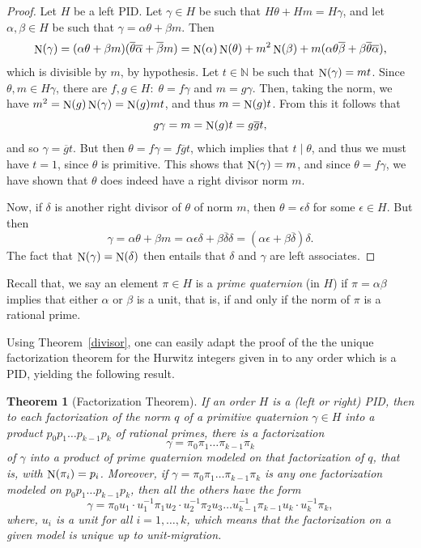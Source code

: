 \documentclass[10pt]{article}
\newtheorem{theorem}{Theorem}
\theoremstyle{definition}
\newcommand\NN{\mathbb{N}}
\newcommand\N{\mathop{\rm N}\nolimits}
\begin{document}
\begin{proof}
  Let $H$ be a left PID.  Let $\gamma \in H$ be such that
  $H \theta + H m = H \gamma$, and let $\alpha, \beta \in H$ be such
  that $\gamma = \alpha \theta + \beta m$. Then
  \[\N(\gamma) = (\alpha \theta + \beta m ) (\overline{\theta}
    \overline{\alpha} + \overline{\beta}m) = \N(\alpha) \N(\theta) +
    m^2 \N(\beta) + m (\alpha \theta \overline{\beta} + \beta
    \overline{\theta} \overline{\alpha}),\] which is divisible by $m$,
  by hypothesis. Let $t \in \NN$ be such that $\N(\gamma)=mt$. Since
  $\theta, m \in H\gamma$, there are
  $f,g \in H \colon \; \theta = f \gamma$ and $m = g \gamma$. Then,
  taking the norm, we have $m^2 = \N(g) \N(\gamma) = \N(g) mt$, and
  thus $m = \N(g)t$. From this it follows that
  \[g \gamma = m = \N(g) t = g\overline{g}t,\] and so
  $\gamma = \overline{g}t$. But then
  $\theta = f \gamma = f \overline{g}t$, which implies that
  $t \mid \theta$, and thus we must have $t = 1$, since $\theta$ is
  primitive. This shows that $\N(\gamma) = m$, and since
  $\theta = f \gamma$, we have shown that $\theta$ does indeed have a
  right divisor norm $m$.
	
  Now, if $\delta$ is another right divisor of $\theta$ of norm $m$,
  then $\theta = \epsilon \delta$ for some $\epsilon \in H$.  But then
  \[\gamma = \alpha \theta + \beta m = \alpha \epsilon \delta + \beta
    \overline{\delta} \delta = (\alpha \epsilon + \beta
    \overline{\delta}) \delta.\] The fact that
  $\N(\gamma) = \N(\delta)$ then entails that $\delta$ and $\gamma$
  are left associates.
\end{proof}

Recall that, we say an element $\pi \in H$ is a \textit{prime
  quaternion} (in $H$) if $\pi = \alpha \beta $ implies that either
$\alpha$ or $\beta$ is a unit, that is, if and only if the norm of
$\pi$ is a rational prime.

Using Theorem~\ref{divisor}, one can easily adapt the proof of the the
unique factorization theorem for the Hurwitz integers given in
\cite{Conway_Smith} to any order which is a PID, yielding the
following result.

\begin{theorem}[Factorization Theorem] \label{Fact_thm} If an order
  $H$ is a (left or right) PID, then to each factorization of the norm
  $q$ of a primitive quaternion $\gamma \in H$ into a product
  $p_0p_1 \dots p_{k-1}p_k$ of rational primes, there is a
  factorization
  \[ \gamma = \pi_0 \pi_1 \dots \pi_{k-1} \pi_k \] of $\gamma$ into a
  product of prime quaternion modeled on that factorization of $q$,
  that is, with $\N(\pi_i) = p_i$.  Moreover, if
  $\gamma = \pi_0 \pi_1 \dots \pi_{k-1}\pi_k$ is any one factorization
  modeled on $p_0p_1 \dots p_{k-1}p_k$, then all the others have the
  form
  \[\gamma = \pi_0 u_1 \cdot u^{-1}_1 \pi_1 u_2 \cdot u^{-1}_2 \pi_2
    u_3 \dots u^{-1}_{k-1} \pi_{k-1} u_k \cdot u^{-1}_k \pi_k,\]
  where, $u_i$ is a unit for all $i = 1, \dots, k$, which means that
  the factorization on a given model is unique up to unit-migration.
\end{theorem}
\end{document}
